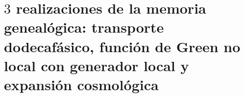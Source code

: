 \chapter{\texorpdfstring{\(3\)}{3} realizaciones de la memoria genealógica: transporte dodecafásico, función de Green no local con generador local y expansión cosmológica}
\label{chap:md-memoria-tres-realizaciones}
\begingroup
\let\HMTOwnerSection\section
\let\HMTOwnerSubsection\subsection
\let\HMTOwnerSubsubsection\subsubsection
\let\HMTOwnerParagraph\paragraph
\let\chapter\HMTOwnerSection
\let\section\HMTOwnerSubsection
\let\subsection\HMTOwnerSubsubsection
\let\subsubsection\HMTOwnerParagraph

\endgroup

\begingroup
\def\HMTDesiredChapterTitle{Descenso icosaédrico \texorpdfstring{\(A_5/C_5\)}{A5/C5} y selección del portador gravitatorio pentacomponente}%
\let\HMTOriginalChapter\chapter
\renewcommand{\chapter}[2][]{\HMTOriginalChapter{\HMTDesiredChapterTitle}}%

\endgroup

